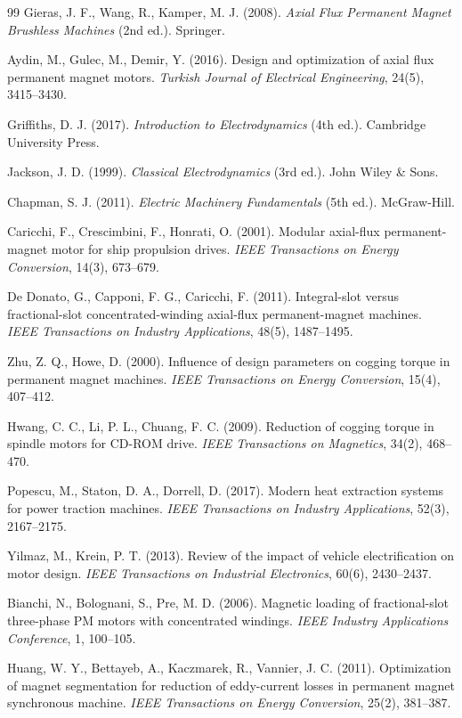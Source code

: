 \documentclass[12pt,a4paper]{article}
\begin{document}
\begin{thebibliography}{99}
Gieras, J. F., Wang, R., Kamper, M. J. (2008). \textit{Axial Flux Permanent Magnet Brushless Machines} (2nd ed.). Springer.

Aydin, M., Gulec, M., Demir, Y. (2016). Design and optimization of axial flux permanent magnet motors. \textit{Turkish Journal of Electrical Engineering}, 24(5), 3415--3430.

Griffiths, D. J. (2017). \textit{Introduction to Electrodynamics} (4th ed.). Cambridge University Press.

Jackson, J. D. (1999). \textit{Classical Electrodynamics} (3rd ed.). John Wiley \& Sons.

Chapman, S. J. (2011). \textit{Electric Machinery Fundamentals} (5th ed.). McGraw-Hill.

Caricchi, F., Crescimbini, F., Honrati, O. (2001). Modular axial-flux permanent-magnet motor for ship propulsion drives. \textit{IEEE Transactions on Energy Conversion}, 14(3), 673--679.

De Donato, G., Capponi, F. G., Caricchi, F. (2011). Integral-slot versus fractional-slot concentrated-winding axial-flux permanent-magnet machines. \textit{IEEE Transactions on Industry Applications}, 48(5), 1487--1495.

Zhu, Z. Q., Howe, D. (2000). Influence of design parameters on cogging torque in permanent magnet machines. \textit{IEEE Transactions on Energy Conversion}, 15(4), 407--412.

Hwang, C. C., Li, P. L., Chuang, F. C. (2009). Reduction of cogging torque in spindle motors for CD-ROM drive. \textit{IEEE Transactions on Magnetics}, 34(2), 468--470.

Popescu, M., Staton, D. A., Dorrell, D. (2017). Modern heat extraction systems for power traction machines. \textit{IEEE Transactions on Industry Applications}, 52(3), 2167--2175.

Yilmaz, M., Krein, P. T. (2013). Review of the impact of vehicle electrification on motor design. \textit{IEEE Transactions on Industrial Electronics}, 60(6), 2430--2437.

Bianchi, N., Bolognani, S., Pre, M. D. (2006). Magnetic loading of fractional-slot three-phase PM motors with concentrated windings. \textit{IEEE Industry Applications Conference}, 1, 100--105.

Huang, W. Y., Bettayeb, A., Kaczmarek, R., Vannier, J. C. (2011). Optimization of magnet segmentation for reduction of eddy-current losses in permanent magnet synchronous machine. \textit{IEEE Transactions on Energy Conversion}, 25(2), 381--387.


\end{thebibliography}
\end{document}

